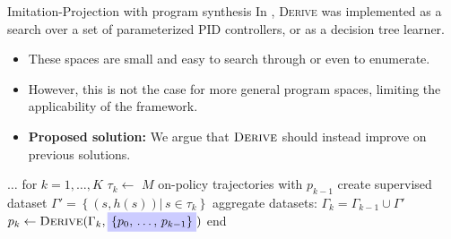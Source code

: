 \begin{frame}[fragile]{Imitation-Projection with program synthesis}
In \citet{Verma_Le_Yue_Chaudhuri_2019}, \textsc{Derive} was implemented as a search over a set of parameterized PID controllers, or as a decision tree learner.

\begin{itemize}
    \item These spaces are small and easy to search through or even to enumerate.
    \item However, this is not the case for more general program spaces, limiting the applicability of the framework.
    \item \textbf{Proposed solution:} We argue that $\textsc{Derive}$ should instead improve on previous solutions.
\end{itemize}

\begin{algorithm}[caption={$\textsc{Project}$: imitation learning by improvement}]
 $\dots$
 for $k = 1, \dots, K$
   $\tau_k \leftarrow $ $M$ on-policy trajectories with $p_{k-1}$
   create supervised dataset $\Gamma' = \left\{\left(s, h(s)\right) |\, s \in \tau_k \right\}$
   aggregate datasets: $\Gamma_k = \Gamma_{k-1} \cup \Gamma' \quad$
   $p_k \leftarrow \textsc{Derive}(\Gamma_k, \highlight{\{p_0,\,\dots,\,p_{k-1}\}})$
 end
\end{algorithm}
\end{frame}

